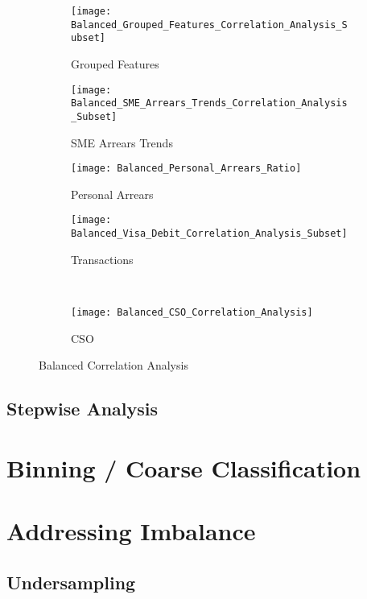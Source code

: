 \begin{figure}[H]
	\centering
	\begin{subfigure}[b]{0.32\textwidth}
		\captionsetup{font=scriptsize}
		\texttt{[image: Balanced\_Grouped\_Features\_Correlation\_Analysis\_Subset]}\caption{Grouped Features}\label{fig:groupedFeaturesCorrelation}
	\end{subfigure} 
	\begin{subfigure}[b]{0.32\textwidth}
		\captionsetup{font=scriptsize}
		\texttt{[image: Balanced\_SME\_Arrears\_Trends\_Correlation\_Analysis\_Subset]}
		\caption{SME Arrears Trends}\label{fig:smeArrearsCorrelation}
	\end{subfigure} 
	\begin{subfigure}[b]{0.32\textwidth}
		\captionsetup{font=scriptsize}
		\texttt{[image: Balanced\_Personal\_Arrears\_Ratio]}
		\caption{Personal Arrears}\label{fig:personalArrearsCorrelation}
	\end{subfigure} 
	\medskip
	\begin{subfigure}[b]{0.32\textwidth}
		\captionsetup{font=scriptsize}
		\texttt{[image: Balanced\_Visa\_Debit\_Correlation\_Analysis\_Subset]}
		\caption{Transactions}\label{fig:transVisaCorrelation}
	\end{subfigure} ~\quad
	\begin{subfigure}[b]{0.32\textwidth}
		\captionsetup{font=scriptsize}
		\texttt{[image: Balanced\_CSO\_Correlation\_Analysis]}
		\caption{CSO}\label{fig:CSOCorrelation}
	\end{subfigure}
	\caption{Balanced Correlation Analysis}
	\label{fig:balanced_corr_analysis}
\end{figure}


\subsection{Stepwise Analysis}

\section{Binning / Coarse Classification}

\section{Addressing Imbalance}
\subsection{Undersampling}
